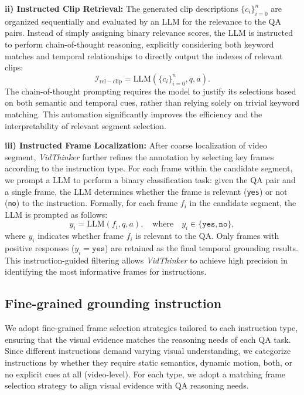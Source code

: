 \noindent\textbf{ii) Instructed Clip Retrieval:} The generated clip descriptions $ \{c_i\}_{i=0}^n$ are organized sequentially and evaluated by an LLM for the relevance to the QA pairs. Instead of simply assigning binary relevance scores, the LLM is instructed to perform chain-of-thought reasoning, explicitly considering both keyword matches and temporal relationships to directly output the indexes of relevant clips:
\begin{equation}
    \mathcal{I}_\mathrm{rel-clip} = \mathrm{LLM}(\{c_i\}_{i=0}^n, q, a).
\end{equation}
The chain-of-thought prompting requires the model to justify its selections based on both semantic and temporal cues, rather than relying solely on trivial keyword matching. This automation significantly improves the efficiency and the interpretability of relevant segment selection.
    
\noindent\textbf{iii) Instructed Frame Localization:} After coarse localization of video segment, \textit{VidThinker} further refines the annotation by selecting key frames according to the instruction type. For each frame within the candidate segment, we prompt a LLM to perform a binary classification task: given the QA pair and a single frame, the LLM determines whether the frame is relevant (\texttt{yes}) or not (\texttt{no}) to the instruction.
Formally, for each frame $f_i$ in the candidate segment, the LLM is prompted as follows:
\begin{equation}
    y_i = \mathrm{LLM}(f_i, q, a), \quad \text{where} \quad y_i \in \{\texttt{yes}, \texttt{no}\},
\end{equation}
where $y_i$ indicates whether frame $f_i$ is relevant to the QA.
Only frames with positive responses ($y_i = \texttt{yes}$) are retained as the final temporal grounding results. This instruction-guided filtering allows \textit{VidThinker} to achieve high precision in identifying the most informative frames for instructions.



\subsection{Fine-grained grounding instruction}
\label{taxonomy}
We adopt fine-grained frame selection strategies tailored to each instruction type, ensuring that the visual evidence matches the reasoning needs of each QA task. Since different instructions demand varying visual understanding, we categorize instructions by whether they require static semantics, dynamic motion, both, or no explicit cues at all (video-level). For each type, we adopt a matching frame selection strategy to align visual evidence with QA reasoning needs.


